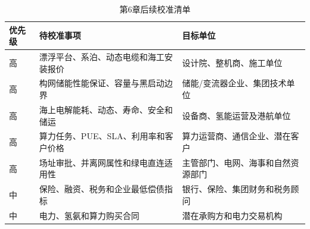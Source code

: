 \begin{table}[H]
\centering
\caption{第6章后续校准清单}
\label{tab:c6-calibration}
\small
\begin{tabularx}{\textwidth}{p{1.5cm} X X}
\toprule
优先级 & 待校准事项 & 目标单位\\
\midrule
高 & 漂浮平台、系泊、动态电缆和海工安装报价 & 设计院、整机商、施工单位\\
高 & 构网储能性能保证、容量与黑启动边界 & 储能/变流器企业、集团技术单位\\
高 & 海上电解能耗、动态、寿命、安全和储运 & 设备商、氢能运营及港航单位\\
高 & 算力任务、PUE、SLA、利用率和客户价格 & 算力运营商、通信企业、潜在客户\\
高 & 场址审批、并离网属性和绿电直连适用性 & 主管部门、电网、海事和自然资源部门\\
中 & 保险、融资、税务和企业最低偿债指标 & 银行、保险、集团财务和税务顾问\\
中 & 电力、氢氨和算力购买合同 & 潜在承购方和电力交易机构\\
\bottomrule
\end{tabularx}
\end{table}

